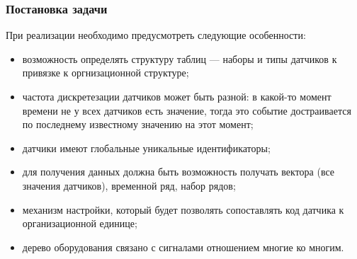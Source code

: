 \documentclass[pdf, hyperref={unicode}, aspectratio=169]{beamer}
\begin{document}
\begin{frame}
	\frametitle{Постановка задачи}
	
	При реализации необходимо предусмотреть следующие особенности:
	\begin{itemize}
		\item возможность определять структуру таблиц --- наборы и типы датчиков к привязке к оргнизационной структуре;
		\item частота дискретезации датчиков может быть разной: в какой-то момент времени не у всех датчиков есть значение, тогда это событие достраивается по последнему известному значению на этот момент;
		\item датчики имеют глобальные уникальные идентификаторы;
		\item для получения данных должна быть возможность получать вектора (все значения датчиков), временной ряд, набор рядов;
		\item механизм настройки, который будет позволять сопоставлять код датчика к организационной единице;
		\item дерево оборудования связано с сигналами отношением многие ко многим.
	\end{itemize}
\end{frame}



\end{document}
